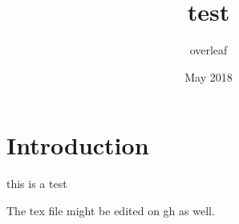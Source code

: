 \documentclass{article}
\title{test}
\author{overleaf }
\date{May 2018}
\begin{document}
\maketitle

\section{Introduction}
this is a test

The tex file might be edited on gh as well.
\end{document}
